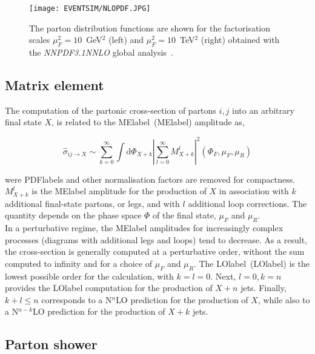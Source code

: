  \begin{figure}[hbtp]
    \RawFloats
    \begin{center}
    \texttt{[image: EVENTSIM/NLOPDF.JPG]}
    \caption{
        The parton distribution functions are shown for the factorisation scales $\mu_F^2=10$~GeV$^2$ (left) and $\mu_F^2=10$~TeV$^2$ (right) obtained with the \textit{NNPDF3.1NNLO} global analysis~\cite{Ball_2017}.}
    \label{figEVNTSIM:PDF}
    \end{center}
\end{figure}

\subsection{Matrix element}

The computation of the partonic cross-section of partons $i,j$ into an arbitrary final state $X$, is related to the \acrlong{MElabel}~(\acrshort{MElabel}) amplitude as,

\begin{equation}
    \hat{\sigma}_{ij\to X} \sim \sum_{k=0}^{\infty} \int \text{d}\Phi_{X+k}\left|\sum_{l=0}^{\infty} M^l_{X+k}\right|^2(\Phi_F,\mu_F,\mu_R)
\end{equation}

were \acrshort{PDFlabel}s and other normalisation factors are removed for compactness. $M^l_{X+k}$ is the \acrshort{MElabel} amplitude for the production of $X$ in association with $k$ additional final-state partons, or legs, and with $l$ additional loop corrections. The quantity depends on the phase space $\Phi$ of the final state, $\mu_F$ and $\mu_R$.\\

In a perturbative regime, the \acrshort{MElabel} amplitudes for increasingly complex processes (diagrams with additional legs and loops) tend to decrease. As a result, the cross-section is generally computed at a perturbative order, without the sum computed to infinity and for a choice of $\mu_F$ and $\mu_R$. The \acrlong{LOlabel}~(\acrshort{LOlabel}) is the lowest possible order for the calculation, with $k=l=0$. Next, $l=0,k=n$ provides the \acrshort{LOlabel} computation for the production of $X+n$ jets. Finally, $k+l\leq n$ corresponds to a N$^n$LO prediction for the production of $X$, while also to a N$^{n-k}$LO prediction for the production of $X+k$ jets.

\subsection{Parton shower}


